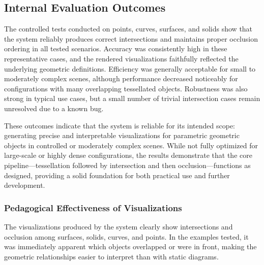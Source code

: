 \subsection{Internal Evaluation Outcomes}

The controlled tests conducted on points, curves, surfaces, and solids 
show that the system reliably produces correct intersections and 
maintains proper occlusion ordering in all tested scenarios. 
Accuracy was consistently high in these representative cases, 
and the rendered visualizations faithfully reflected the underlying 
geometric definitions. Efficiency was generally acceptable for small 
to moderately complex scenes, although performance decreased noticeably 
for configurations with many overlapping tessellated objects.
Robustness was also strong in typical use cases, but a small number 
of trivial intersection cases remain unresolved due to a known bug.

These outcomes indicate that the system is reliable for its intended 
scope: generating precise and interpretable visualizations for 
parametric geometric objects in controlled or moderately complex 
scenes. While not fully optimized for large-scale or highly dense 
configurations, the results demonstrate that the core 
pipeline—tessellation followed by intersection and then 
occlusion—functions as designed, providing a solid foundation for 
both practical use and further development.


\subsubsection{Pedagogical Effectiveness of Visualizations}

The visualizations produced by the system clearly show intersections 
and occlusion among surfaces, solids, curves, and points. 
In the examples tested, it was immediately apparent which objects 
overlapped or were in front, making the geometric relationships 
easier to interpret than with static diagrams.  

